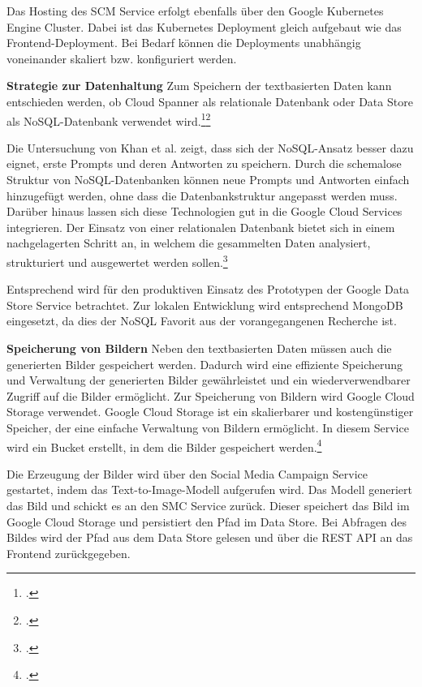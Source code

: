 Das Hosting des SCM Service erfolgt ebenfalls über den Google Kubernetes Engine Cluster.
Dabei ist das Kubernetes Deployment gleich aufgebaut wie das Frontend-Deployment.
Bei Bedarf können die Deployments unabhängig voneinander skaliert bzw. konfiguriert werden.

\textbf{Strategie zur Datenhaltung}\newline
Zum Speichern der textbasierten Daten kann entschieden werden, ob Cloud Spanner als relationale Datenbank oder Data Store als NoSQL-Datenbank verwendet wird.\footcite{google_spanner}\footcite{google_datastore}

Die Untersuchung von Khan et al. zeigt, dass sich der NoSQL-Ansatz besser dazu eignet, erste Prompts und deren Antworten zu speichern.
Durch die schemalose Struktur von NoSQL-Datenbanken können neue Prompts und Antworten einfach hinzugefügt werden, ohne dass die Datenbankstruktur angepasst werden muss.
Darüber hinaus lassen sich diese Technologien gut in die Google Cloud Services integrieren.
Der Einsatz von einer relationalen Datenbank bietet sich in einem nachgelagerten Schritt an, in welchem die gesammelten Daten analysiert, strukturiert und ausgewertet werden sollen.\footcite{Khan2022SQL}

Entsprechend wird für den produktiven Einsatz des Prototypen der Google Data Store Service betrachtet.
Zur lokalen Entwicklung wird entsprechend MongoDB eingesetzt, da dies der NoSQL Favorit aus der vorangegangenen Recherche ist.

\textbf{Speicherung von Bildern}\newline
Neben den textbasierten Daten müssen auch die generierten Bilder gespeichert werden.
Dadurch wird eine effiziente Speicherung und Verwaltung der generierten Bilder gewährleistet und ein wiederverwendbarer Zugriff auf die Bilder ermöglicht.
Zur Speicherung von Bildern wird Google Cloud Storage verwendet.
Google Cloud Storage ist ein skalierbarer und kostengünstiger Speicher, der eine einfache Verwaltung von Bildern ermöglicht.
In diesem Service wird ein Bucket erstellt, in dem die Bilder gespeichert werden.\footcite{google_storage}

Die Erzeugung der Bilder wird über den Social Media Campaign Service gestartet, indem das Text-to-Image-Modell aufgerufen wird.
Das Modell generiert das Bild und schickt es an den \ac{SMC} Service zurück.
Dieser speichert das Bild im Google Cloud Storage und persistiert den Pfad im Data Store.
Bei Abfragen des Bildes wird der Pfad aus dem Data Store gelesen und über die \ac{REST} \ac{API} an das Frontend zurückgegeben.

